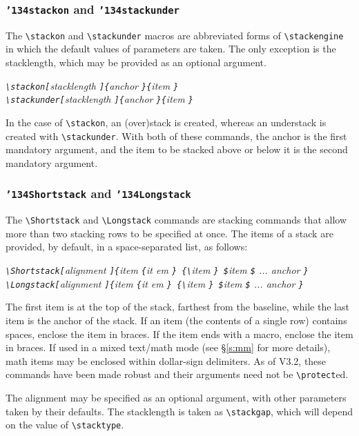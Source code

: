 \documentclass{article}
\let\vb\verb
\newcommand\cmd[1]{\texttt{\char'134#1}}
\begin{document}
\subsubsection{\cmd{stackon} and \cmd{stackunder}\label{s:sou}}

The \vb|\stackon| and \vb|\stackunder| macros are abbreviated forms
of \vb|\stackengine| in which the default values of parameters are
taken.  The only exception is the stacklength, which may be provided as
an optional argument.

\itshape
\vb|\stackon[|stacklength%
  \vb|]{|anchor%
  \vb|}{|item
  \vb|}|\\
\vb|\stackunder[|stacklength%
  \vb|]{|anchor%
  \vb|}{|item
  \vb|}|
\upshape

In the case of \vb|\stackon|, an (over)stack is created, whereas an
understack is created with \vb|\stackunder|.  With both of these
commands, the anchor is the first mandatory argument, and the item to be
stacked above or below it is the second mandatory argument.\vspace{-0.8ex}

\subsubsection{\cmd{Shortstack} and \cmd{Longstack}\label{s:sls}}

The \vb|\Shortstack| and \vb|\Longstack| commands are stacking commands
that allow more than two stacking rows to be specified at once.  The
items of a stack are provided, by default, in a space-separated list, as
follows:

\itshape
\vb|\Shortstack[|alignment%
  \vb|]{|item %
  \vb|{|it em%
  \vb|} {\|item%
  \vb|} $|item%
  \vb|$| ... anchor%
  \vb|}|\\
\vb|\Longstack[|alignment%
  \vb|]{|item %
  \vb|{|it em%
  \vb|} {\|item%
  \vb|} $|item%
  \vb|$| ... anchor%
  \vb|}|
\upshape

The first item is at the top of the stack, farthest from the baseline,
while the last item is the anchor of the stack.  If an item (the
contents of a single row) contains spaces, enclose the item in braces.
If the item ends with a macro, enclose the item in braces. 
If used in a mixed text/math mode (see \S\ref{s:mm} for more
details), math items may be enclosed within dollar-sign delimiters.  As of 
V3.2, these commands have been made robust and their arguments need
not be \verb|\protect|ed.

The alignment may be specified as an optional argument, with other
parameters taken by their defaults.  The stacklength is taken as
\vb|\stackgap|, which will depend on the value of \vb|\stacktype|.
\end{document}
